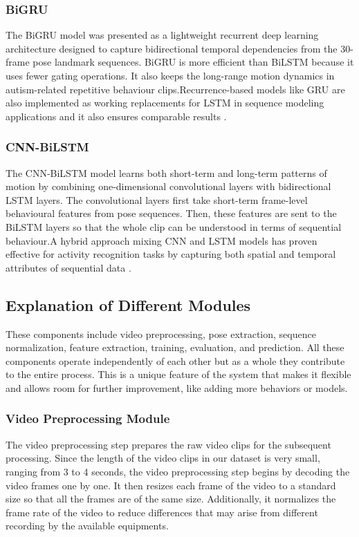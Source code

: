 \subsubsection{BiGRU}
The BiGRU model was presented as a lightweight recurrent deep learning architecture designed to capture bidirectional temporal dependencies from the 30-frame pose landmark sequences. BiGRU is more efficient than BiLSTM because it uses fewer gating operations. It also keeps the long-range motion dynamics in autism-related repetitive behaviour clips.Recurrence-based models like GRU are also implemented as working replacements for LSTM in sequence modeling applications and it also ensures comparable results \cite{ordonez2016deep}.

\subsubsection{CNN-BiLSTM}
The CNN-BiLSTM model learns both short-term and long-term patterns of motion by combining one-dimensional convolutional layers with bidirectional LSTM layers. The convolutional layers first take short-term frame-level behavioural features from pose sequences. Then, these features are sent to the BiLSTM layers so that the whole clip can be understood in terms of sequential behaviour.A hybrid approach mixing CNN and LSTM models has proven effective for activity recognition tasks by capturing both spatial and temporal attributes of sequential data \cite{ordonez2016deep}.

\subsection{Explanation of Different Modules}
These components include video preprocessing, pose extraction, sequence normalization, feature extraction, training, evaluation, and prediction. All these components operate independently of each other but as a whole they contribute to the entire process. This is a unique feature of the system that makes it flexible and allows room for further improvement, like adding more behaviors or models.
\subsubsection{Video Preprocessing Module}
The video preprocessing step prepares the raw video clips for the subsequent processing. Since the length of the video clips in our dataset is very small, ranging from 3 to 4 seconds, the video preprocessing step begins by decoding the video frames one by one. It then resizes each frame of the video to a standard size so that all the frames are of the same size. Additionally, it normalizes the frame rate of the video to reduce differences that may arise from different recording by the available equipments.
